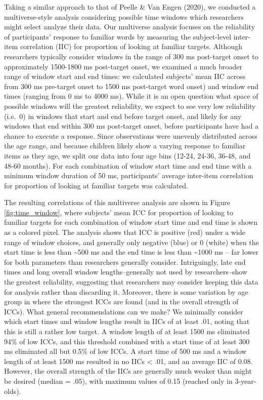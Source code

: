 \documentclass[10pt, letterpaper]{article}
\begin{document}
Taking a similar approach to that of Peelle \& Van Engen (2020), we
conducted a multiverse-style analysis considering possible time windows
which researchers might select analyze their data. Our multiverse
analysis focuses on the reliability of participants' response to
familiar words by measuring the subject-level inter-item correlation
(IIC) for proportion of looking at familiar targets. Although
researchers typically consider windows in the range of 300 ms
post-target onset to approximately 1500-1800 ms post-target onset, we
examined a much broader range of window start and end times: we
calculated subjects' mean IIC across from 300 ms pre-target onset to
1500 ms post-target word onset) and window end times (ranging from 0 ms
to 4000 ms). While it is an open question what space of possible windows
will the greatest reliability, we expect to see very low reliability
(i.e.~0) in windows that start and end before target onset, and likely
for any windows that end within 300 ms post-target onset, before
participants have had a chance to execute a response. Since observations
were unevenly distributed across the age range, and because children
likely show a varying response to familiar items as they age, we split
our data into four age bins (12-24, 24-36, 36-48, and 48-60 months). For
each combination of window start time and end time with a minimum window
duration of 50 ms, participants' average inter-item correlation for
proportion of looking at familiar targets was calculated.

The resulting correlations of this multiverse analysis are shown in
Figure \ref{fig:time_window}, where subjects' mean ICC for proportion of
looking to familiar targets for each combination of window start time
and end time is shown as a colored pixel. The analysis shows that ICC is
positive (red) under a wide range of window choices, and generally only
negative (blue) or 0 (white) when the start time is less than
\textasciitilde500 ms and the end time is less than \textasciitilde1000
ms -- far lower for both parameters than researchers generally consider.
Intriguingly, late end times and long overall window lengths--generally
not used by researchers--show the greatest reliability, suggesting that
researchers may consider keeping this data for analysis rather than
discarding it. Moreover, there is some variation by age group in where
the strongest ICCs are found (and in the overall strength of ICCs). What
general recommendations can we make? We minimally consider which start
times and window lengths result in IICs of at least .01, noting that
this is still a rather low target. A window length of at least 1500 ms
eliminated 94\% of low ICCs, and this threshold combined with a start
time of at least 300 ms eliminated all but 0.5\% of low ICCs. A start
time of 500 ms and a window length of at least 1500 ms resulted in no
IICs \textless{} .01, and an average IIC of 0.08. However, the overall
strength of the IICs are generally much weaker than might be desired
(median = .05), with maximum values of 0.15 (reached only in
3-year-olds).
\end{document}
